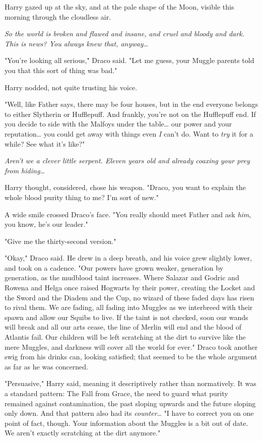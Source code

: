 Harry gazed up at the sky, and at the pale shape of the Moon, visible this
morning through the cloudless air.

\emph{So the world is broken and flawed and insane, and cruel and bloody and
dark. This is news? You always knew that, anyway{\ldots}}

"You're looking all serious," Draco said. "Let me guess, your Muggle parents
told you that this sort of thing was bad."

Harry nodded, not quite trusting his voice.

"Well, like Father says, there may be four houses, but in the end everyone
belongs to either Slytherin or Hufflepuff. And frankly, you're not on the
Hufflepuff end. If you decide to side with the Malfoys under the table{\ldots}
our power and your reputation{\ldots} you could get away with things even
\emph{I} can't do. Want to \emph{try} it for a while? See what it's like?"

\emph{Aren't we a clever little serpent. Eleven years old and already coaxing
your prey from hiding{\ldots}}

Harry thought, considered, chose his weapon. "Draco, you want to explain the
whole blood purity thing to me? I'm sort of new."

A wide smile crossed Draco's face. "You really should meet Father and ask
\emph{him}, you know, he's our leader."

"Give me the thirty-second version."

"Okay," Draco said. He drew in a deep breath, and his voice grew slightly
lower, and took on a cadence. "Our powers have grown weaker, generation by
generation, as the mudblood taint increases. Where Salazar and Godric and
Rowena and Helga once raised Hogwarts by their power, creating the Locket and
the Sword and the Diadem and the Cup, no wizard of these faded days has risen
to rival them. We are fading, all fading into Muggles as we interbreed with
their spawn and allow our Squibs to live. If the taint is not checked, soon our
wands will break and all our arts cease, the line of Merlin will end and the
blood of Atlantis fail. Our children will be left scratching at the dirt to
survive like the mere Muggles, and darkness will cover all the world for ever."
Draco took another swig from his drinks can, looking satisfied; that seemed to
be the whole argument as far as he was concerned.

"Persuasive," Harry said, meaning it descriptively rather than normatively. It
was a standard pattern: The Fall from Grace, the need to guard what purity
remained against contamination, the past sloping upwards and the future sloping
only down. And that pattern also had its \emph{counter}{\ldots} "I have to
correct you on one point of fact, though. Your information about the Muggles is
a bit out of date. We aren't exactly scratching at the dirt anymore."

